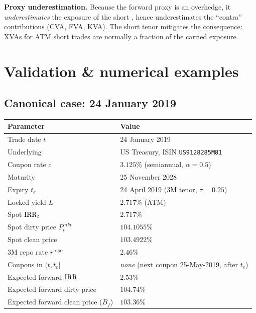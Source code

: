 \documentclass[11pt,a4paper]{article}
\newcommand{\Tlock}{\text{T-Lock}}
\newcommand{\Bf}{B_f}
\newcommand{\rrepo}{r^{\mathrm{repo}}}
\begin{document}
\textbf{Proxy underestimation.} Because the forward proxy is an
overhedge, it \emph{underestimates} the exposure of the short
\Tlock, hence underestimates the ``contra'' contributions (CVA, FVA,
KVA). The short tenor mitigates the consequence: XVAs for ATM short
trades are normally a fraction of the carried exposure.

\section{Validation \& numerical examples}\label{sec:validation}

\subsection{Canonical case: 24 January 2019}\label{sec:canonical}

\begin{tabular}{@{}p{5.8cm}l@{}}
\toprule
Parameter                          & Value \\
\midrule
Trade date $t$                     & 24 January 2019 \\
Underlying                         & US Treasury, ISIN \texttt{US9128285M81} \\
Coupon rate $c$                    & $3.125\%$ (semiannual, $\alpha = 0.5$) \\
Maturity                           & 25 November 2028 \\
Expiry $t_e$                       & 24 April 2019 (3M tenor, $\tau = 0.25$) \\
Locked yield $L$                   & $2.717\%$ (ATM) \\
Spot $\mathrm{IRR}_t$                      & $2.717\%$ \\
Spot dirty price $P^{mkt}_t$       & $104.1055\%$ \\
Spot clean price                   & $103.4922\%$ \\
3M repo rate $\rrepo$              & $2.46\%$ \\
Coupons in $(t, t_e]$              & \emph{none} (next coupon 25-May-2019, after $t_e$) \\
Expected forward $\mathrm{IRR}$            & $2.53\%$ \\
Expected forward dirty price       & $104.74\%$ \\
Expected forward clean price ($\Bf$) & $103.36\%$ \\
\bottomrule
\end{tabular}
\end{document}
